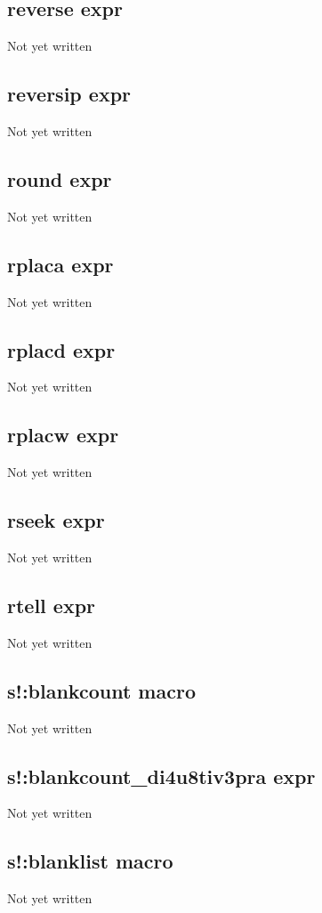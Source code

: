 \documentclass[a4paper,11pt]{article}
\begin{document}
\subsection{\ttfamily reverse expr}
Not yet written

\subsection{\ttfamily reversip expr}
Not yet written

\subsection{\ttfamily round expr}
Not yet written

\subsection{\ttfamily rplaca expr}
Not yet written

\subsection{\ttfamily rplacd expr}
Not yet written

\subsection{\ttfamily rplacw expr}
Not yet written

\subsection{\ttfamily rseek expr}
Not yet written

\subsection{\ttfamily rtell expr}
Not yet written

\subsection{\ttfamily s!:blankcount macro}
Not yet written

\subsection{\ttfamily s!:blankcount\_di4u8tiv3pra expr}
Not yet written

\subsection{\ttfamily s!:blanklist macro}
Not yet written
\end{document}
